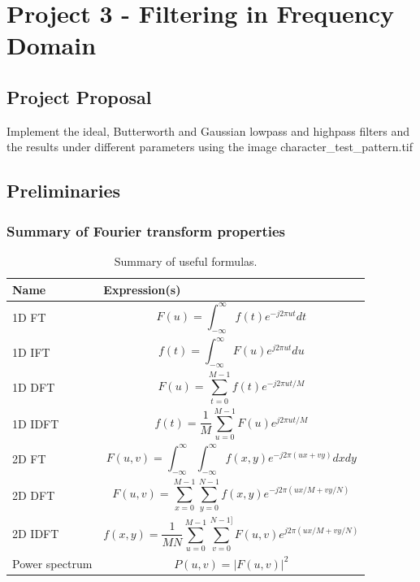 \section{Project 3 - Filtering in Frequency Domain}

\subsection{Project Proposal}
Implement the ideal, Butterworth and Gaussian lowpass and highpass filters and the results under different parameters using the image character\_test\_pattern.tif

\subsection{Preliminaries}
\subsubsection{Summary of Fourier transform properties}

\begin{table}[h]
	\caption{Summary of useful formulas.}
	\centering
	\begin{tabular}{|l|m{}|}\hline
		Name & Expression(s) \\ \hline
		1D FT & \begin{equation}F(u)=\int_{-\infty}^\infty f(t)e^{-j2 \pi ut}dt \end{equation} \\ 
		1D IFT & \begin{equation}f(t)=\int_{-\infty}^\infty F(u)e^{j2 \pi ut}du\end{equation} \\
		1D DFT & \begin{equation}F(u)=\sum_{t=0}^{M-1}f(t)e^{-j2\pi ut/M} \end{equation} \\
		1D IDFT & \begin{equation}f(t)=\frac{1}{M}\sum_{u=0}^{M-1}F(u)e^{j2\pi ut/M}\end{equation} \\
		2D FT & \begin{equation} F(u,v)=\int_{-\infty}^\infty \int_{-\infty}^\infty f(x,y)e^{-j2 \pi (ux+vy)}dxdy \end{equation} \\
		2D DFT & \begin{equation} F(u,v)= \sum_{x=0}^{M-1}\sum_{y=0}^{N-1} f(x,y)e^{-j2\pi (ux/M+vy/N)}\end{equation} \\
		2D IDFT & \begin{equation} f(x,y) = \frac{1}{MN}\sum_{u=0}^{M-1}\sum_{v=0}^{N-1]}F(u,v)e^{j2\pi(ux/M+vy/N)} \end{equation} \\
		Power spectrum & \begin{equation} P(u,v)=|F(u,v)|^2 \end{equation} \\
		\hline
	\end{tabular}
\end{table}

